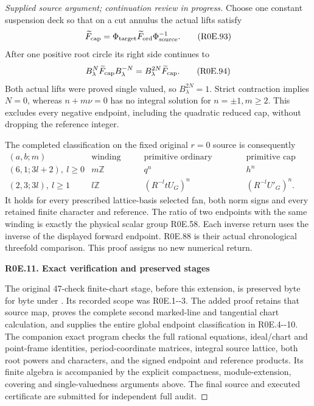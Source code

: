 \begin{proof}[Supplied source argument; continuation review in progress]
Choose one constant suspension deck so that on a cut annulus
the actual lifts satisfy
\[
 \widetilde F_{\rm cap}
   =\Phi_{\rm target}\widetilde F_{\rm ord}\Phi_{\rm source}^{-1}.
 \tag{R0E.93}
\]
After one positive root circle its right side continues to
\[
 B_\lambda^N\widetilde F_{\rm cap}B_\lambda^{-N}
                   =B_\lambda^{2N}\widetilde F_{\rm cap}.
 \tag{R0E.94}
\]
Both actual lifts were proved single valued, so
\(B_\lambda^{2N}=1\). Strict contraction implies \(N=0\), whereas
\(n+m\nu=0\) has no integral solution for \(n=\pm1,m\ge2\).
This excludes every negative endpoint, including the quadratic
reduced cap, without dropping the reference integer.

The completed classification on the fixed original \(r=0\) source
is consequently
\[
 \begin{array}{c|c|c|c}
 (a,b;m)&\text{winding group}&\text{primitive ordinary forward map}
                                &\text{primitive cap map}\\ \hline
 (6,1;3l+2),\ l\ge0&m\mathbb Z&q^n&h^n\\
 (2,3;3l),\ l\ge1&l\mathbb Z&(R^{-l}tU_G)^n&(R^{-l}U'_G)^n .
 \end{array}                                                       \tag{R0E.95}
\]
It holds for every prescribed lattice-basis selected fan, both
norm signs and every retained finite character and reference.
The ratio of two endpoints with the same winding is exactly
the physical scalar group R0E.58. Each inverse return uses the
inverse of the displayed forward endpoint. R0E.88 is their
actual chronological threefold comparison. This proof assigns
no new numerical return.

\par

\medskip\noindent\textbf{R0E.11. Exact verification and preserved stages}

\par\nobreak

The original 47-check finite-chart stage, before this extension,
is preserved byte for byte under
.
Its recorded scope was R0E.1-\/-3. The added proof retains that
source map, proves the complete second marked-line and tangential
chart calculation, and supplies the entire global endpoint
classification in R0E.4-\/-10. The companion exact program checks
the full rational equations, ideal/chart and point-frame
identities, period-coordinate matrices, integral source lattice,
both root powers and characters, and the signed endpoint and
reference products. Its finite algebra is accompanied by the
explicit compactness, module-extension, covering and
single-valuedness arguments above. The final source and executed
certificate are submitted for independent full audit.


\end{proof}
